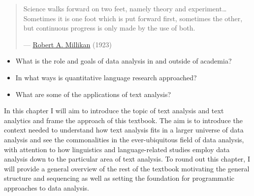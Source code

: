 \documentclass[
  letterpaper,
]{latex/krantz}
\providecommand{\tightlist}{%
  \setlength{\itemsep}{0pt}\setlength{\parskip}{0pt}}\usepackage{longtable,booktabs,array}
\begin{document}
\begin{quote}
Science walks forward on two feet, namely theory and
experiment\ldots Sometimes it is one foot which is put forward first,
sometimes the other, but continuous progress is only made by the use of
both.

---
\href{https://www.nobelprize.org/uploads/2018/06/millikan-lecture.pdf}{Robert
A. Millikan} (1923)
\end{quote}

\begin{tcolorbox}[enhanced jigsaw, opacitybacktitle=0.6, breakable, colframe=quarto-callout-note-color-frame, arc=.35mm, left=2mm, leftrule=.75mm, title=\textcolor{quarto-callout-note-color}{\faInfo}\hspace{0.5em}{Keys}, opacityback=0, colback=white, toptitle=1mm, rightrule=.15mm, titlerule=0mm, bottomtitle=1mm, bottomrule=.15mm, coltitle=black, colbacktitle=quarto-callout-note-color!10!white, toprule=.15mm]

\begin{itemize}
\tightlist
\item
  What is the role and goals of data analysis in and outside of
  academia?
\item
  In what ways is quantitative language research approached?
\item
  What are some of the applications of text analysis?
\end{itemize}

\end{tcolorbox}

In this chapter I will aim to introduce the topic of text analysis and
text analytics and frame the approach of this textbook. The aim is to
introduce the context needed to understand how text analysis fits in a
larger universe of data analysis and see the commonalities in the
ever-ubiquitous field of data analysis, with attention to how
linguistics and language-related studies employ data analysis down to
the particular area of text analysis. To round out this chapter, I will
provide a general overview of the rest of the textbook motivating the
general structure and sequencing as well as setting the foundation for
programmatic approaches to data analysis.
\end{document}
